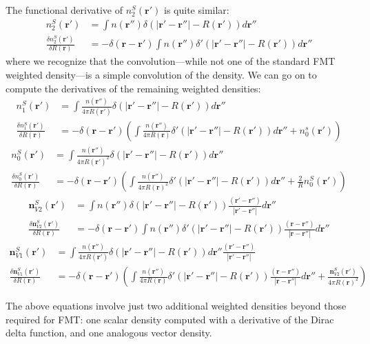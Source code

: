 \documentclass[letterpaper,twocolumn,amsmath,amssymb,jcp,10pt,aip]{revtex4-1}
\newcommand{\rr}{\textbf{r}}
\begin{document}
\begin{widetext}
The functional derivative of $n_2^S(\rr')$ is quite similar:
\begin{align}
  n_2^{S}(\rr') &= \int n(\rr'') \delta(|\rr' - \rr''| - R(\rr'))d\mathbf
  r''\\
  \frac{\delta n_2^{S}(\rr')}{\delta R(\rr)} &= -\delta(\rr-\rr') \int n(\rr'')
  \delta'(|\rr'-\rr''| - R(\rr')) d\rr''
\end{align}
where we recognize that the convolution---while not one of the standard
FMT weighted density---is a simple convolution of the density.  We can
go on to compute the derivatives of the remaining weighted densities:
\begin{align}
  n_1^{S}(\rr') &= \int \frac{n(\rr'')}{4\pi R(\rr')} \delta(|\rr' - \rr''| - R(\rr'))d\mathbf r''\\
    \frac{\delta n_1^{S}(\rr')}{\delta R(\rr)} &=
    -\delta(\rr-\rr') \left( \int \frac{n(\rr'')}{4\pi R(\rr)}
    \delta'(|\rr'-\rr''| - R(\rr')) d\rr''
    + n_0^s(\rr') \right)
\end{align}
\begin{align}
  n_0^{S}(\rr') &= \int \frac{n(\rr'')}{4\pi R(\rr')^2} \delta(|\rr' - \rr''| - R(\rr'))d\mathbf r''\\
    \frac{\delta n_0^{S}(\rr')}{\delta R(\rr)}
    &= -\delta(\rr-\rr') \left( \int \frac{n(\rr'')}{4\pi R(\rr)^2}
    \delta'(|\rr'-\rr''| - R(\rr')) d\rr''
    +
    \frac{2}{R} n_0^S(\rr') \right)
\end{align}
\begin{align}
  \mathbf{n}_{V2}^{S}(\rr') &= \int n(\rr'') \delta(|\rr' - \rr''| - R(\rr'))
  \frac{(\rr' - \rr'')}{|\rr' - \rr''|} d \rr''\\
  \frac{\delta \mathbf{n}_{V2}^{S}(\rr')}{\delta R(\rr)} &= -\delta(\rr - \rr')
  \int n(\rr'') \delta'(|\rr' - \rr''| - R(\rr'))
  \frac{(\rr - \rr'')}{|\rr - \rr''|} d\rr''
\end{align}
\begin{align}
 \mathbf{n}_{V1}^{S}(\rr') &= \int \frac{n(\rr'')}{4\pi R(\rr')} \delta(|\rr' - \rr''| - R(\rr'))d\mathbf r''
   \frac{(\rr' - \rr'')}{|\rr' - \rr''|}\\
 \frac{\delta \mathbf{n}_{V1}^{S}(\rr')}{\delta R(\rr)}
 &= -\delta(\rr-\rr')\left(\int \frac{n(\rr'')}{4\pi R(\rr)}
   \delta'(|\rr'-\rr''| - R(\rr')) \frac{(\rr - \rr'')}{|\rr - \rr''|}  d\rr''
   + \frac{\mathbf{n}_{V2}^S(\rr')}{4\pi R(\rr)^2} \right)
\end{align}

The above equations involve just two additional weighted densities
beyond those required for FMT: one scalar density computed with a
derivative of the Dirac delta function, and one analogous vector
density.

\end{widetext}

\end{document}
